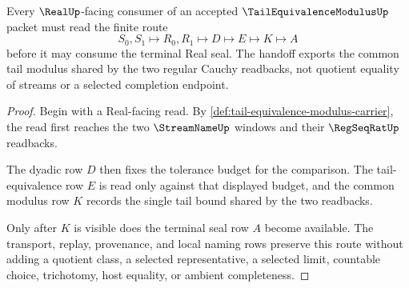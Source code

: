 \begin{theorem}
\label{thm:tail-equivalence-modulus-real-seal-handoff}
Every $\RealUp$-facing consumer of an accepted $\TailEquivalenceModulusUp$ packet must read the finite route
$$
S_0,S_1 \longmapsto R_0,R_1 \longmapsto D \longmapsto E \longmapsto K \longmapsto A
$$
before it may consume the terminal Real seal. The handoff exports the common tail modulus shared by the two regular Cauchy readbacks, not quotient equality of streams or a selected completion endpoint.
\end{theorem}
\begin{proof}
Begin with a Real-facing read. By \autoref{def:tail-equivalence-modulus-carrier}, the read first reaches the two $\StreamNameUp$ windows and their $\RegSeqRatUp$ readbacks.

The dyadic row $D$ then fixes the tolerance budget for the comparison. The tail-equivalence row $E$ is read only against that displayed budget, and the common modulus row $K$ records the single tail bound shared by the two readbacks.

Only after $K$ is visible does the terminal seal row $A$ become available. The transport, replay, provenance, and local naming rows preserve this route without adding a quotient class, a selected representative, a selected limit, countable choice, trichotomy, host equality, or ambient completeness.
\end{proof}




